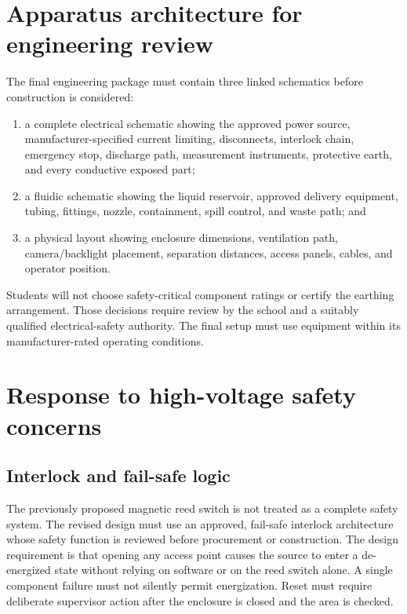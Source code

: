 \documentclass[11pt]{article}
\begin{document}
\section{Apparatus architecture for engineering review}

The final engineering package must contain three linked schematics before construction is considered:
\begin{enumerate}
    \item a complete electrical schematic showing the approved power source, manufacturer-specified current limiting, disconnects, interlock chain, emergency stop, discharge path, measurement instruments, protective earth, and every conductive exposed part;
    \item a fluidic schematic showing the liquid reservoir, approved delivery equipment, tubing, fittings, nozzle, containment, spill control, and waste path; and
    \item a physical layout showing enclosure dimensions, ventilation path, camera/backlight placement, separation distances, access panels, cables, and operator position.
\end{enumerate}

Students will not choose safety-critical component ratings or certify the earthing arrangement. Those decisions require review by the school and a suitably qualified electrical-safety authority. The final setup must use equipment within its manufacturer-rated operating conditions.

\section{Response to high-voltage safety concerns}

\subsection{Interlock and fail-safe logic}

The previously proposed magnetic reed switch is not treated as a complete safety system. The revised design must use an approved, fail-safe interlock architecture whose safety function is reviewed before procurement or construction. The design requirement is that opening any access point causes the source to enter a de-energized state without relying on software or on the reed switch alone. A single component failure must not silently permit energization. Reset must require deliberate supervisor action after the enclosure is closed and the area is checked.
\end{document}
